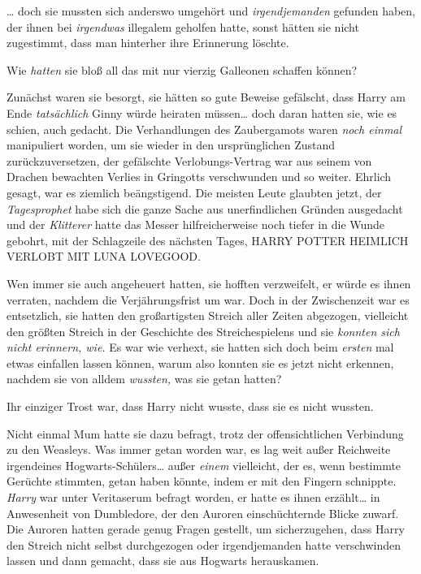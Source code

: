 {… doch sie mussten sich anderswo umgehört und \emph{irgendjemanden} gefunden haben, der ihnen bei \emph{irgendwas} illegalem geholfen hatte, sonst hätten sie nicht zugestimmt, dass man hinterher ihre Erinnerung löschte.

Wie \emph{hatten} sie bloß all das mit nur vierzig Galleonen schaffen können?

Zunächst waren sie besorgt, sie hätten so gute Beweise gefälscht, dass Harry am Ende \emph{tatsächlich} Ginny würde heiraten müssen… doch daran hatten sie, wie es schien, auch gedacht. Die Verhandlungen des Zaubergamots waren \emph{noch einmal} manipuliert worden, um sie wieder in den ursprünglichen Zustand zurückzuversetzen, der gefälschte Verlobungs-Vertrag war aus seinem von Drachen bewachten Verlies in Gringotts verschwunden und so weiter. Ehrlich gesagt, war es ziemlich beängstigend. Die meisten Leute glaubten jetzt, der \emph{Tagesprophet} habe sich die ganze Sache aus unerfindlichen Gründen ausgedacht und der \emph{Klitterer} hatte das Messer hilfreicherweise noch tiefer in die Wunde gebohrt, mit der Schlagzeile des nächsten Tages, HARRY POTTER HEIMLICH VERLOBT MIT LUNA LOVEGOOD.

Wen immer sie auch angeheuert hatten, sie hofften verzweifelt, er würde es ihnen verraten, nachdem die Verjährungsfrist um war. Doch in der Zwischenzeit war es entsetzlich, sie hatten den großartigsten Streich aller Zeiten abgezogen, vielleicht den größten Streich in der Geschichte des Streichespielens und sie \emph{konnten sich nicht erinnern, wie.} Es war wie verhext, sie hatten sich doch beim \emph{ersten} mal etwas einfallen lassen können, warum also konnten sie es jetzt nicht erkennen, nachdem sie von alldem \emph{wussten,} was sie getan hatten?

Ihr einziger Trost war, dass Harry nicht wusste, dass sie es nicht wussten.

Nicht einmal Mum hatte sie dazu befragt, trotz der offensichtlichen Verbindung zu den Weasleys. Was immer getan worden war, es lag weit außer Reichweite irgendeines Hogwarts-Schülers… außer \emph{einem} vielleicht, der es, wenn bestimmte Gerüchte stimmten, getan haben könnte, indem er mit den Fingern schnippte. \emph{Harry} war unter Veritaserum befragt worden, er hatte es ihnen erzählt… in Anwesenheit von Dumbledore, der den Auroren einschüchternde Blicke zuwarf. Die Auroren hatten gerade genug Fragen gestellt, um sicherzugehen, dass Harry den Streich nicht selbst durchgezogen oder irgendjemanden hatte verschwinden lassen und dann gemacht, dass sie aus Hogwarts herauskamen.

}
